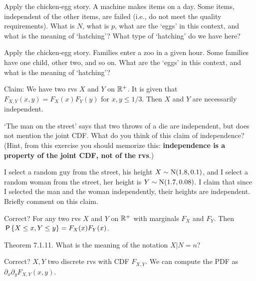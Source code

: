 \documentclass[assignments]{subfiles}
\begin{document}
\begin{exercise}
Apply the chicken-egg story.
A machine makes items on a day.
Some items, independent of the other items, are failed (i.e., do not meet the quality requirements).
What is $N$, what is $p$, what are the `eggs' in this context, and what is the meaning of `hatching'?
What type of `hatching' do we have here?
\end{exercise}

\begin{exercise}
Apply the chicken-egg story. Families enter a zoo in a given hour. Some families have one child, other two, and so on. 
What are the `eggs' in this context, and what is the meaning of `hatching'? 
\end{exercise}


\begin{exercise}
Claim: We have two rvs $X$ and $Y$ on $\R^{+}$. It is given that $F_{X,Y}(x,y) = F_X(x)F_Y(y)$ for $x,y \leq 1/3$. Then  $X$ and $Y$ are necessarily independent. 
\end{exercise}

\begin{exercise}
`The man on the street' says that two throws of a die are independent, but does not mention the joint CDF.
What do you think of this claim of independence?
(Hint, from this exercise you should memorize this: \textbf{independence is a property of the joint CDF, not of the rvs}.)
\end{exercise}


\begin{exercise}
I select a random guy from the street, his height $X\sim\Norm{1.8, 0.1}$, and I select a random woman from the street, her height is $Y\sim\Norm{1.7, 0.08}$.
I claim that since I selected the man and the woman independently, their heights are independent.
Briefly comment on this claim.
\end{exercise}


\begin{exercise}
Correct? For any two rvs $X$ and $Y$ on $\R^{+}$ with marginals $F_{X}$ and $F_{Y}$. Then $\P{X\leq x, Y\leq y} = F_{X}(x) F_{Y}(x)$.
\end{exercise}

\begin{exercise}
Theorem 7.1.11. What is the meaning of the notation $X|N=n$?
\end{exercise}

\begin{exercise}
Correct? $X, Y$ two discrete rvs with CDF $F_{X,Y}$. We can compute the PDF as $\partial_{x}\partial_{y} F_{X,Y}(x,y)$.
\end{exercise}
\end{document}
